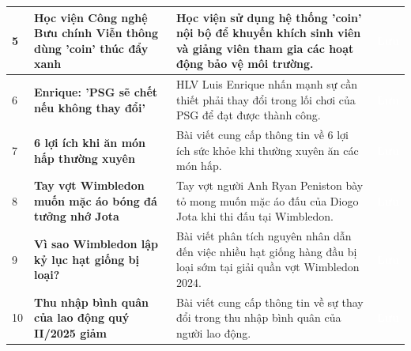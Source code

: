 \documentclass[12pt,a4paper]{article}
\begin{document}
\begin{longtable}{|p{}|L{0.45\textwidth}|L{0.42\textwidth}|p{0.06\textwidth}|}
5 & \textbf{Học viện Công nghệ Bưu chính Viễn thông dùng 'coin' thúc đẩy xanh}  & Học viện sử dụng hệ thống 'coin' nội bộ để khuyến khích sinh viên và giảng viên tham gia các hoạt động bảo vệ môi trường. & \textcolor{white}{\textbf{Lưu}} \\
\hline

6 & \textbf{Enrique: 'PSG sẽ chết nếu không thay đổi'}  & HLV Luis Enrique nhấn mạnh sự cần thiết phải thay đổi trong lối chơi của PSG để đạt được thành công. & \textcolor{white}{\textbf{Lưu}} \\
\hline

7 & \textbf{6 lợi ích khi ăn món hấp thường xuyên}  & Bài viết cung cấp thông tin về 6 lợi ích sức khỏe khi thường xuyên ăn các món hấp. & \textcolor{white}{\textbf{Lưu}} \\
\hline

8 & \textbf{Tay vợt Wimbledon muốn mặc áo bóng đá tưởng nhớ Jota}  & Tay vợt người Anh Ryan Peniston bày tỏ mong muốn mặc áo đấu của Diogo Jota khi thi đấu tại Wimbledon. & \textcolor{white}{\textbf{Lưu}} \\
\hline

9 & \textbf{Vì sao Wimbledon lập kỷ lục hạt giống bị loại?}  & Bài viết phân tích nguyên nhân dẫn đến việc nhiều hạt giống hàng đầu bị loại sớm tại giải quần vợt Wimbledon 2024. & \textcolor{white}{\textbf{Lưu}} \\
\hline

10 & \textbf{Thu nhập bình quân của lao động quý II/2025 giảm}  & Bài viết cung cấp thông tin về sự thay đổi trong thu nhập bình quân của người lao động. & \textcolor{white}{\textbf{Lưu}} \\
\hline


\end{longtable}
\end{document}
